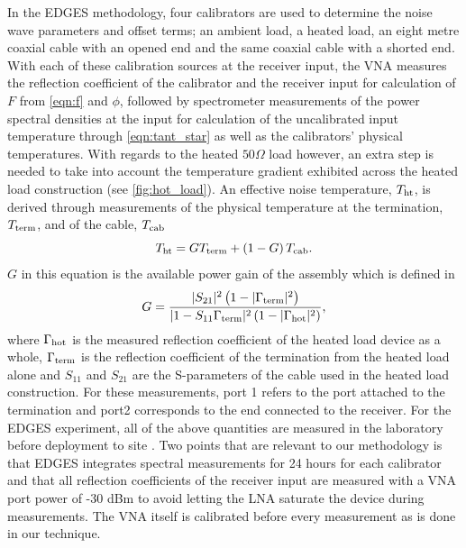 In the EDGES methodology, four calibrators are used to determine the noise wave parameters and offset terms; an ambient load, a heated load, an eight metre coaxial cable with an opened end and the same coaxial cable with a shorted end. With each of these calibration sources at the receiver input, the VNA measures the reflection coefficient of the calibrator and the receiver input for calculation of $F$ from \cref{eqn:f} and $\phi$, followed by spectrometer measurements of the power spectral densities at the input for calculation of the uncalibrated input temperature through \cref{eqn:tant_star} as well as the calibrators’ physical temperatures. With regards to the heated $50 \Omega$ load however, an extra step is needed to take into account the temperature gradient exhibited across the heated load construction (see \cref{fig:hot_load}). An effective noise temperature, $T_{\mathrm{ht}}$, is derived through measurements of the physical temperature at the termination, $T_{\mathrm{term}}$, and of the cable, $T_{\mathrm{cab}}$
\begin{equation}
    T_{\mathrm{ht}} = GT_{\mathrm{term}} + \left( 1 - G \right) T_{\mathrm{cab}}.
    \label{eqn:hot_load_correction}
\end{equation}
$G$ in this equation is the available power gain of the assembly which is defined in \citet{pozar}
\begin{equation}
    G = \frac{|S_{21}|^2 \left( 1 - |\Gamma_{\mathrm{term}}|^2 \right)}{|1 - S_{11}\Gamma_{\mathrm{term}}|^2 \left(1 - |\Gamma_{\mathrm{hot}}|^2 \right)},
    \label{eqn:g}
\end{equation}
where $\Gamma_{\mathrm{hot}}$ is the measured reflection coefficient of the heated load device as a whole, $\Gamma_{\mathrm{term}}$ is the reflection coefficient of the termination from the heated load alone and $S_{11}$ and $S_{21}$ are the S-parameters of the cable used in the heated load construction. For these measurements, port 1 refers to the port attached to the termination and port2 corresponds to the end connected to the receiver. For the EDGES experiment, all of the above quantities are measured in the laboratory before deployment to site \citep{edgesCal}. Two points that are relevant to our methodology is that EDGES integrates spectral measurements for 24 hours for each calibrator and that all reflection coefficients of the receiver input are measured with a VNA port power of -30 dBm to avoid letting the LNA saturate the device during measurements. The VNA itself is calibrated before every measurement as is done in our technique.

